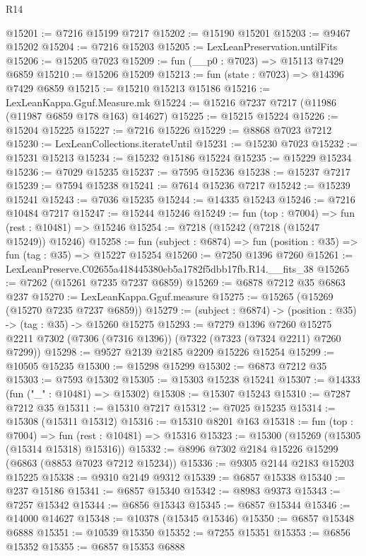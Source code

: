 \begin{lexlean}{R14}
\begin{coremodule}
@15201 := @7216 @15199 @7217
@15202 := @15190 @15201
@15203 := @9467 @15202
@15204 := @7216 @15203
@15205 := LexLeanPreservation.untilFits
@15206 := @15205 @7023
@15209 := fun (__p0 : @7023) => @15113 @7429 @6859
@15210 := @15206 @15209
@15213 := fun (state : @7023) => @14396 @7429 @6859
@15215 := @15210 @15213 @15186
@15216 := LexLeanKappa.Gguf.Measure.mk
@15224 := @15216 @7237 @7217 (@11986 (@11987 @6859 @178 @163) @14627)
@15225 := @15215 @15224
@15226 := @15204 @15225
@15227 := @7216 @15226
@15229 := @8868 @7023 @7212
@15230 := LexLeanCollections.iterateUntil
@15231 := @15230 @7023
@15232 := @15231 @15213
@15234 := @15232 @15186 @15224
@15235 := @15229 @15234
@15236 := @7029 @15235
@15237 := @7595 @15236
@15238 := @15237 @7217
@15239 := @7594 @15238
@15241 := @7614 @15236 @7217
@15242 := @15239 @15241
@15243 := @7036 @15235
@15244 := @14335 @15243
@15246 := @7216 @10484 @7217
@15247 := @15244 @15246
@15249 := fun (top : @7004) => fun (rest : @10481) => @15246
@15254 := @7218 (@15242 (@7218 (@15247 @15249)) @15246)
@15258 := fun (subject : @6874) => fun (position : @35) => fun (tag : @35) => @15227 @15254
@15260 := @7250 @1396 @7260
@15261 := LexLeanPreserve.C02655a418445380eb5a1782f5dbb17fb.R14.__fits_38
@15265 := @7262 (@15261 @7235 @7237 @6859)
@15269 := @6878 @7212 @35 @6863 @237
@15270 := LexLeanKappa.Gguf.measure
@15275 := @15265 (@15269 (@15270 @7235 @7237 @6859))
@15279 := (subject : @6874) -> (position : @35) -> (tag : @35) -> @15260 @15275
@15293 := @7279
    @1396
    @7260
    @15275
    @2211
    @7302
    (@7306 (@7316 @1396))
    (@7322 (@7323 (@7324 @2211) @7260 @7299))
@15298 := @9527 @2139 @2185 @2209 @15226 @15254
@15299 := @10505 @15235
@15300 := @15298 @15299
@15302 := @6873 @7212 @35
@15303 := @7593 @15302
@15305 := @15303 @15238 @15241
@15307 := @14333 (fun ("_" : @10481) => @15302)
@15308 := @15307 @15243
@15310 := @7287 @7212 @35
@15311 := @15310 @7217
@15312 := @7025 @15235
@15314 := @15308 (@15311 @15312)
@15316 := @15310 @8201 @163
@15318 := fun (top : @7004) => fun (rest : @10481) => @15316
@15323 := @15300 (@15269 (@15305 (@15314 @15318) @15316))
@15332 := @8996 @7302 @2184 @15226 @15299 (@6863 (@8853 @7023 @7212 @15234))
@15336 := @9305 @2144 @2183 @15203 @15225
@15338 := @9310 @2149 @9312
@15339 := @6857 @15338
@15340 := @237 @15186
@15341 := @6857 @15340
@15342 := @8983 @9373
@15343 := @7257 @15342
@15344 := @6856 @15343
@15345 := @6857 @15344
@15346 := @14000 @14627
@15348 := @10378 (@15345 @15346)
@15350 := @6857 @15348 @6888
@15351 := @10539 @15350
@15352 := @7255 @15351
@15353 := @6856 @15352
@15355 := @6857 @15353 @6888

\end{coremodule}
\end{lexlean}
